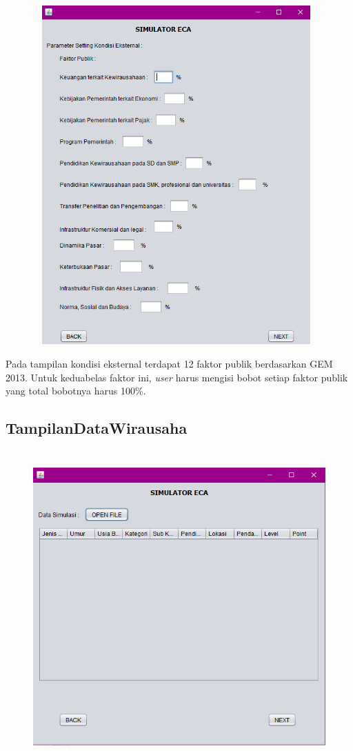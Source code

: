 \begin{figure} [H]
	\centering  
	\includegraphics[width=11cm, height=13cm]{tampilanKondisiEksternal} 
	\label{fig:kondisiEksternal} 
\end{figure}

Pada tampilan kondisi eksternal terdapat 12 faktor publik berdasarkan GEM 2013. Untuk keduabelas faktor ini, \textit{user} harus mengisi bobot setiap faktor publik yang total bobotnya harus 100\%. 

\subsection{TampilanDataWirausaha}

\begin{figure} [H]
	\centering  
	\includegraphics[width=13cm, height=12cm]{tampilanDataWirausaha1} 
	\label{fig:kondisiDataWirausaha} 
\end{figure}

